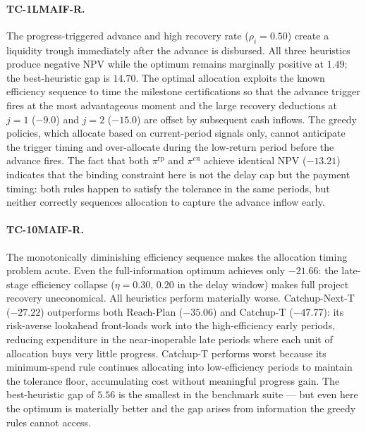 \paragraph{TC-1LMAIF-R.}
The progress-triggered advance and high recovery rate ($\rho_i = 0.50$)
create a liquidity trough immediately after the advance is disbursed.
All three heuristics produce negative NPV while the optimum remains
marginally positive at $1.49$; the best-heuristic gap is $14.70$.
The optimal allocation exploits the known efficiency sequence to
time the milestone certifications so that the advance trigger fires
at the most advantageous moment and the large recovery deductions at
$j=1$ ($-9.0$) and $j=2$ ($-15.0$) are offset by subsequent cash
inflows.  The greedy policies, which allocate based on current-period
signals only, cannot anticipate the trigger timing and over-allocate
during the low-return period before the advance fires.  The fact that
both $\pi^{\mathrm{rp}}$ and $\pi^{\mathrm{cu}}$ achieve identical
NPV ($-13.21$) indicates that the binding constraint here is not the
delay cap but the payment timing: both rules happen to satisfy the
tolerance in the same periods, but neither correctly sequences
allocation to capture the advance inflow early.

\paragraph{TC-10MAIF-R.}
The monotonically diminishing efficiency sequence makes the
allocation timing problem acute.  Even the full-information optimum
achieves only $-21.66$: the late-stage efficiency collapse
($\eta = 0.30,\, 0.20$ in the delay window) makes full project
recovery uneconomical.  All heuristics perform materially worse.
Catchup-Next-T ($-27.22$) outperforms both Reach-Plan ($-35.06$)
and Catchup-T ($-47.77$): its risk-averse lookahead front-loads work
into the high-efficiency early periods, reducing expenditure in the
near-inoperable late periods where each unit of allocation buys
very little progress.  Catchup-T performs worst because its
minimum-spend rule continues allocating into low-efficiency periods
to maintain the tolerance floor, accumulating cost without meaningful
progress gain.  The best-heuristic gap of $5.56$ is the smallest in
the benchmark suite --- but even here the optimum is materially better
and the gap arises from information the greedy rules cannot access.

